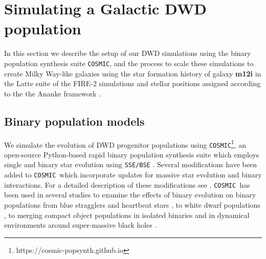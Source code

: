 \documentclass[twocolumn]{aastex631}
\newcommand{\cosmic}{\texttt{COSMIC}}
\begin{document}
\section{Simulating a Galactic DWD population}\label{sec:simulations}
In this section we describe the setup of our DWD simulations using the binary population synthesis suite \cosmic, and the process to scale these simulations to create Milky Way-like galaxies using the star formation history of galaxy \textbf{\textbf{m12i}} in the Latte suite of the FIRE-2 simulations \citep{Wetzel2016, Hopkins2018} and stellar positions assigned according to the the Ananke framework \citep{Sanderson2020}. 


\subsection{Binary population models}
\label{sec:bin_pop}
We simulate the evolution of DWD progenitor populations using \cosmic\footnote{https://cosmic-popsynth.github.io}, an open-source Python-based rapid binary population synthesis suite which employs single and binary star evolution using \texttt{SSE/BSE} \citep{Hurley2000, Hurley2002}. Several modifications have been added to \cosmic\ which incorporate updates for massive star evolution and binary interactions. For a detailed description of these modifications see \citet{Breivik2020a}. \cosmic\ has been used in several studies to examine the effects of binary evolution on binary populations from blue stragglers \citep{Leiner2021} and heartbeat stars \citep{Jayasinghe2021}, to white dwarf populations \citep{Kremer2017,Breivik2018,Kilic2021}, to merging compact object populations in isolated binaries \citep{Zevin2020b, Zevin2020a, Zevin2021, Wong2021, Mandhai2021} and in dynamical environments around super-massive black holes \citep{Stephan2019, Wang2021}. 
\end{document}
